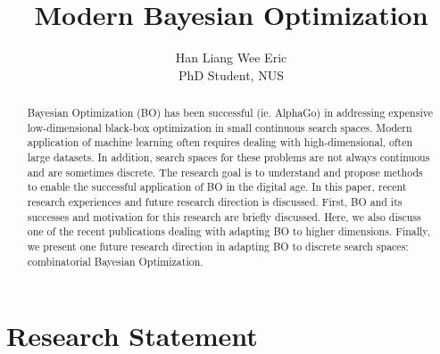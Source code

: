 \documentclass[
    american,a4paper
    ]{scrartcl}
\title{
        Modern Bayesian Optimization
        \\  \Large{\paperSubTitle{\lang}}} %
\author{
        Han Liang Wee Eric\\
        {\small PhD Student, NUS}
        }
\date{\formatdate{28}{04}{2021}}
\begin{document}
      \maketitle
        \begin{abstract}

Bayesian Optimization (BO) has been successful (ie. AlphaGo) in addressing expensive low-dimensional black-box optimization in small continuous search spaces. 
Modern application of machine learning often requires dealing with high-dimensional, often large datasets. 
In addition, search spaces for these problems are not always continuous and are sometimes discrete.
The research goal is to understand and propose methods to enable the successful application of BO in the digital age.
In this paper, recent research experiences and future research direction is discussed.
First, BO and its successes and motivation for this research are briefly discussed.
Here, we also discuss one of the recent publications dealing with adapting BO to higher dimensions.
Finally, we present one future research direction in adapting BO to discrete search spaces: combinatorial Bayesian Optimization.

        \end{abstract}

        \section{Research Statement}
\end{document}
